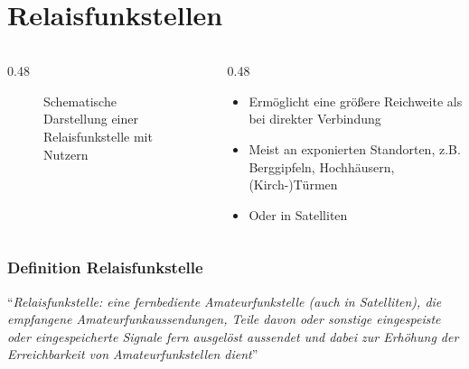 
\section{Relaisfunkstellen}
\label{section:relaisfunkstellen}
\begin{frame}%

\begin{columns}
    \begin{column}{0.48\textwidth}
    
\begin{figure}
    \caption{\scriptsize Schematische Darstellung einer Relaisfunkstelle mit Nutzern}
    \label{n_relaisfunkstellen_aufbau}
\end{figure}


    \end{column}
   \begin{column}{0.48\textwidth}
       \begin{itemize}
  \item Ermöglicht eine größere Reichweite als bei direkter Verbindung
  \item Meist an exponierten Standorten, z.B. Berggipfeln, Hochhäusern, (Kirch-)Türmen
  \item Oder in Satelliten
  \end{itemize}

   \end{column}
\end{columns}

\end{frame}

\begin{frame}
\frametitle{Definition Relaisfunkstelle}
\enquote{\textit{Relaisfunkstelle: eine fernbediente Amateurfunkstelle (auch in Satelliten), die empfangene Amateurfunkaussendungen, Teile davon oder sonstige eingespeiste oder eingespeicherte Signale fern ausgelöst aussendet und dabei zur Erhöhung der Erreichbarkeit von Amateurfunkstellen dient}}

\end{frame}

